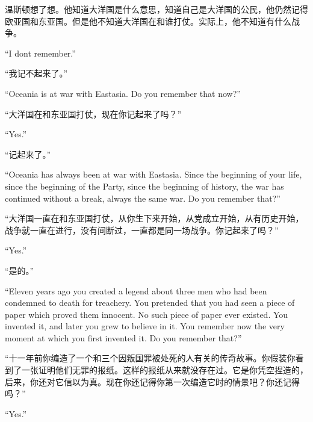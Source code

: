 \begin{paracol}{2}
温斯顿想了想。他知道大洋国是什么意思，知道自己是大洋国的公民，他仍然记得欧亚国和东亚国。但是他不知道大洋国在和谁打仗。实际上，他不知道有什么战争。

\switchcolumn*

``I don\textquotesingle t remember.''

\switchcolumn

``我记不起来了。''

\switchcolumn*

``Oceania is at war with Eastasia. Do you remember that now?''

\switchcolumn

``大洋国在和东亚国打仗，现在你记起来了吗？''

\switchcolumn*

``Yes.''

\switchcolumn

``记起来了。''

\switchcolumn*

``Oceania has always been at war with Eastasia. Since the beginning of
your life, since the beginning of the Party, since the beginning of
history, the war has continued without a break, always the same war. Do
you remember that?''

\switchcolumn

``大洋国一直在和东亚国打仗，从你生下来开始，从党成立开始，从有历史开始，战争就一直在进行，没有间断过，一直都是同一场战争。你记起来了吗？''

\switchcolumn*

``Yes.''

\switchcolumn

``是的。''

\switchcolumn*

``Eleven years ago you created a legend about three men who had been
condemned to death for treachery. You pretended that you had seen a
piece of paper which proved them innocent. No such piece of paper ever
existed. You invented it, and later you grew to believe in it. You
remember now the very moment at which you first invented it. Do you
remember that?''

\switchcolumn

``十一年前你编造了一个和三个因叛国罪被处死的人有关的传奇故事。你假装你看到了一张证明他们无罪的报纸。这样的报纸从来就没存在过。它是你凭空捏造的，后来，你还对它信以为真。现在你还记得你第一次编造它时的情景吧？你还记得吗？''

\switchcolumn*

``Yes.''


\end{paracol}
